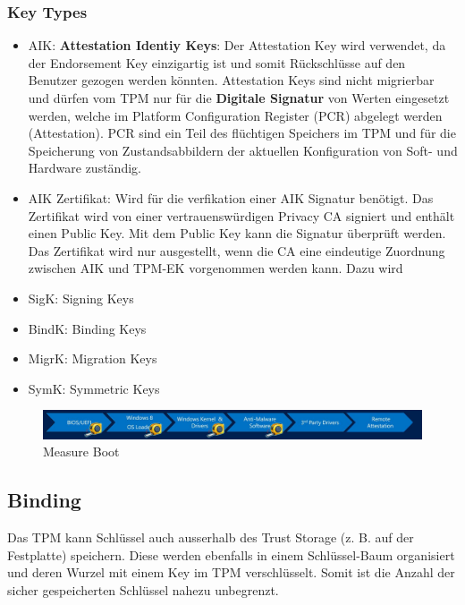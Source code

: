\newpage

\subsubsection{Key Types}
\begin{itemize}
	\item AIK: \textbf{Attestation Identiy Keys}: Der Attestation Key wird verwendet, da der Endorsement Key einzigartig ist und somit Rückschlüsse auf den Benutzer gezogen werden könnten. Attestation Keys sind nicht migrierbar und dürfen vom TPM nur für die \textbf{Digitale Signatur} von Werten eingesetzt werden, welche im Platform Configuration Register (PCR) abgelegt werden (Attestation). PCR sind ein Teil des flüchtigen Speichers im TPM und für die Speicherung von Zustandsabbildern der aktuellen Konfiguration von Soft- und Hardware zuständig.
	\item AIK Zertifikat: Wird für die verfikation einer AIK Signatur benötigt. Das Zertifikat wird von einer vertrauenswürdigen Privacy CA signiert und enthält einen Public Key. Mit dem Public Key kann die Signatur überprüft werden. Das Zertifikat wird nur ausgestellt, wenn die CA eine eindeutige Zuordnung zwischen AIK und TPM-EK vorgenommen werden kann. Dazu wird 
	\item SigK: Signing Keys
	\item BindK: Binding Keys
	\item MigrK: Migration Keys
	\item SymK: Symmetric Keys
\end{itemize}

\begin{figure}[h!]
	\centering
	\includegraphics[width=0.9\linewidth]{images/measure_boot}
	\caption{Measure Boot}
	\label{fig:measureboot}
\end{figure}




\subsection{Binding}
Das TPM kann Schlüssel auch ausserhalb des Trust Storage (z. B. auf der Festplatte) speichern. Diese werden ebenfalls in einem Schlüssel-Baum organisiert und deren Wurzel mit einem Key im TPM verschlüsselt. Somit ist die Anzahl der sicher gespeicherten Schlüssel nahezu unbegrenzt.

